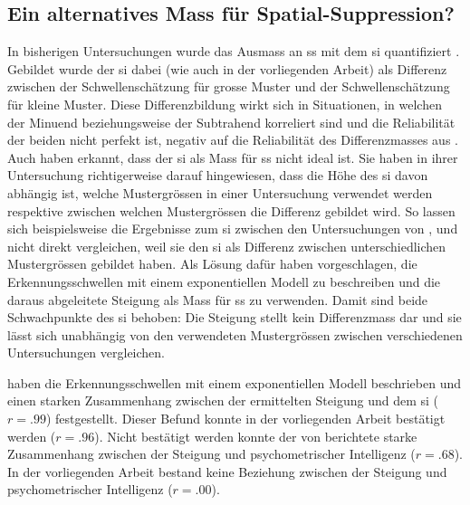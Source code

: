 \documentclass[11pt, twoside, a4paper]{book}		%
\begin{document}
\subsection{Ein alternatives Mass für Spatial-Suppression?}

In bisherigen Untersuchungen wurde das Ausmass an \gls{ss} mit dem \gls{si} quantifiziert \citep{Melnick2013, Tadin2006, Tadin2011}. Gebildet wurde der \gls{si} dabei (wie auch in der vorliegenden Arbeit) als Differenz zwischen der Schwellenschätzung für grosse Muster und der Schwellenschätzung für kleine Muster. Diese Differenzbildung wirkt sich in Situationen, in welchen der Minuend beziehungsweise der Subtrahend korreliert sind und die Reliabilität der beiden nicht perfekt ist, negativ auf die Reliabilität des Differenzmasses aus \citep[S. 145]{Murphy2005}.
Auch \citet{Melnick2013} haben erkannt, dass der \gls{si} als Mass für \gls{ss} nicht ideal ist. Sie haben in ihrer Untersuchung richtigerweise darauf hingewiesen, dass die Höhe des \gls{si} davon abhängig ist, welche Mustergrössen in einer Untersuchung verwendet werden respektive zwischen welchen Mustergrössen die Differenz gebildet wird. So lassen sich beispielsweise die Ergebnisse zum \gls{si} zwischen den Untersuchungen von \citet{Tadin2006}, \citet{Tadin2011} und \citeauthor{Melnick2013} nicht direkt vergleichen, weil sie den \gls{si} als Differenz zwischen unterschiedlichen Mustergrössen gebildet haben. Als Lösung dafür haben \citeauthor{Melnick2013} vorgeschlagen, die Erkennungsschwellen mit einem exponentiellen Modell zu beschreiben und die daraus abgeleitete Steigung als Mass für \gls{ss} zu verwenden. Damit sind beide Schwachpunkte des \gls{si} behoben: Die Steigung stellt kein Differenzmass dar \citep[das heisst sie leidet nicht unter einer verminderten Reliabilität;][S. 145]{Murphy2005} und sie lässt sich unabhängig von den verwendeten Mustergrössen zwischen verschiedenen Untersuchungen vergleichen.

\citet{Melnick2013} haben die Erkennungsschwellen mit einem exponentiellen Modell beschrieben und einen starken Zusammenhang zwischen der ermittelten Steigung und dem \gls{si} ($r=.99$) festgestellt. Dieser Befund konnte in der vorliegenden Arbeit bestätigt werden ($r=.96$). Nicht bestätigt werden konnte der von \citeauthor{Melnick2013} berichtete starke Zusammenhang zwischen der Steigung und psychometrischer Intelligenz ($r=.68$). In der vorliegenden Arbeit bestand keine Beziehung zwischen der Steigung und psychometrischer Intelligenz ($r=.00$).
\end{document}
